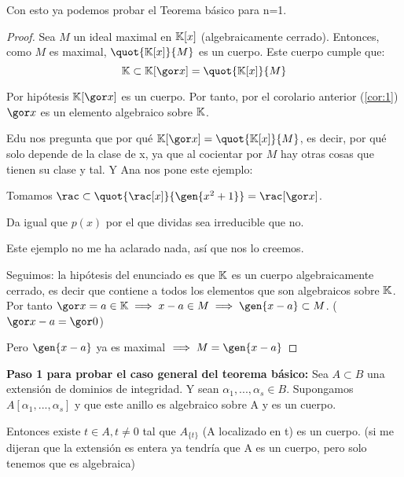 Con esto ya podemos probar el Teorema básico para n=1.
\begin{proof}
	Sea $M$ un ideal maximal en $\mathbb{K}[x]$ (algebraicamente cerrado). Entonces, como $M$ es maximal, $\quot{\K[x]}{M}$ es un cuerpo. Este cuerpo cumple que:
	$$ \K  \subset \K[\cls{x}] = \quot{\K[x]}{M}$$

	Por hipótesis $\K[\cls{x}]$ es un cuerpo. Por tanto, por el corolario anterior (\ref{cor:1}) $\cls{x}$ es un elemento algebraico sobre $\mathbb{K}$.

	Edu nos pregunta que por qué $\K[\cls{x}] = \quot{\K[x]}{M}$, es decir, por qué solo depende de la clase de x, ya que al cocientar por $M$ hay otras cosas que tienen su clase y tal. Y Ana nos pone este ejemplo:

	\begin{example}
		Tomamos $\rac \subset \quot{\rac[x]}{\gen{x^2+1}} = \rac[\cls{x}]$.

		Da igual que $p(x)$ por el que dividas sea irreducible que no.

		Este ejemplo no me ha aclarado nada, así que nos lo creemos.
	\end{example}

	Seguimos: la hipótesis del enunciado es que $\mathbb{K}$ es un cuerpo algebraicamente cerrado, es decir que contiene a todos los elementos que son algebraicos sobre $\mathbb{K}$. Por tanto $\cls{x}=a \in \K \implies x-a \in M \implies \gen{x-a} \subset M$. ($\cls{x}-a = \cls{0}$)

	Pero $\gen{x-a}$ ya es maximal $\implies M = \gen{x-a}$
\end{proof}


\begin{prop}
	\textbf{Paso 1 para probar el caso general del teorema básico:}
	Sea $A \subset B$ una extensión de dominios de integridad. Y sean $\alpha_1,...,\alpha_s \in B$. Supongamos $A[\alpha_1,...,\alpha_s]$ y que este anillo es algebraico sobre A y es un cuerpo.

	Entonces existe $t \in A, t \neq 0$ tal que $A_{\{t\}}$ (A localizado en t) es un cuerpo. (si me dijeran que la extensión es entera ya tendría que A es un cuerpo, pero solo tenemos que es algebraica)
\end{prop}

